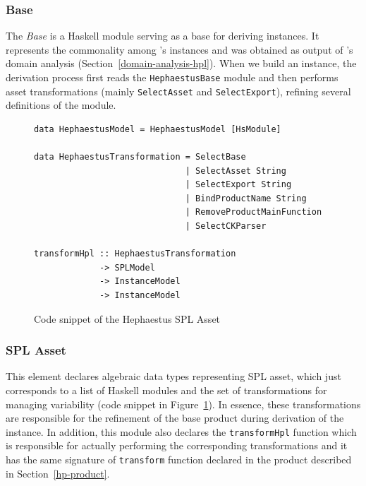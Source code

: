 
\subsubsection{\hp{} Base} 
\label{hp-base}

The \hp{} \emph{Base} is a Haskell module serving as a base for deriving \hpl{} instances. It represents the commonality among \hpl's instances and was obtained as output of \hpl{}'s domain analysis (Section~\ref{domain-analysis-hpl}).  When we build an \hpl{} instance, the derivation process first reads the \texttt{HephaestusBase} module and then performs \hp{} asset transformations (mainly \texttt{SelectAsset} and \texttt{SelectExport}), refining several definitions of the module. 


\begin{figure}
\begin{lstlisting}
data HephaestusModel = HephaestusModel [HsModule]

data HephaestusTransformation = SelectBase
                              | SelectAsset String
                              | SelectExport String
                              | BindProductName String
                              | RemoveProductMainFunction
                              | SelectCKParser

transformHpl :: HephaestusTransformation
             -> SPLModel
             -> InstanceModel
             -> InstanceModel
\end{lstlisting}
\caption{Code snippet of the Hephaestus SPL Asset}
\label{fig:code-hp-spl-asset}
\end{figure}


\subsubsection{\hp{} SPL Asset} 
\label{hp-spl-asset}

This element declares algebraic data types representing \hp{} SPL asset, which just corresponds to a list of Haskell modules and the set of transformations for managing \hpl{} variability (code snippet in Figure~\ref{fig:code-hp-spl-asset}). In essence, these transformations are responsible for the refinement of the base product during derivation of the \hpl{} instance. In addition, this module also declares the \texttt{transformHpl} function which is responsible for actually performing the corresponding \hpl{} transformations and it has the same signature of \texttt{transform} function declared in the \hp{} product described in Section~\ref{hp-product}.

